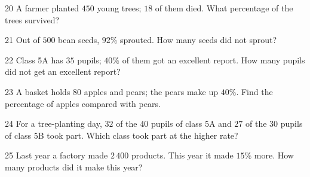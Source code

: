\gap
\begin{probbox}{20}{\relax}
A farmer planted $450$ young trees; $18$ of them died. What percentage of the trees survived?
\end{probbox}
\gap
\begin{probbox}{21}{\relax}
Out of $500$ bean seeds, $92\%$ sprouted. How many seeds did not sprout?
\end{probbox}
\gap
\begin{probbox}{22}{\relax}
Class 5A has $35$ pupils; $40\%$ of them got an excellent report. How many pupils did not get an excellent report?
\end{probbox}
\gap
\begin{probbox}{23}{\relax}
A basket holds $80$ apples and pears; the pears make up $40\%$. Find the percentage of apples compared with pears.
\end{probbox}
\gap
\begin{probbox}{24}{\relax}
For a tree-planting day, $32$ of the $40$ pupils of class 5A and $27$ of the $30$ pupils of class 5B took part. Which class took part at the higher rate?
\end{probbox}
\gap
\begin{probbox}{25}{\relax}
Last year a factory made $2\,400$ products. This year it made $15\%$ more. How many products did it make this year?
\end{probbox}
